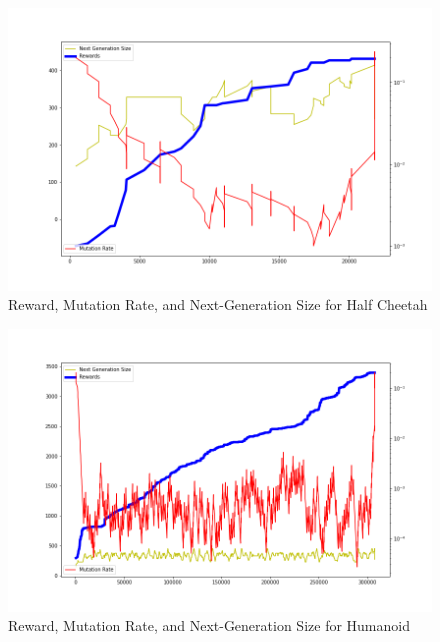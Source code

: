 \documentclass{article}
\begin{document}
\begin{figure}
    \centerline{\includegraphics[scale=0.5]{tripleGraph_hc.png}}
    \caption{Reward, Mutation Rate, and Next-Generation Size for Half Cheetah}
    \label{fig:gaHalfCheetahResults}
\end{figure}

\begin{figure}
    \centerline{\includegraphics[scale=0.5]{tripleGraph_human.png}}        
    \caption{Reward, Mutation Rate, and Next-Generation Size for Humanoid}
    \label{fig:gaHumanoid}
\end{figure}
\end{document}
